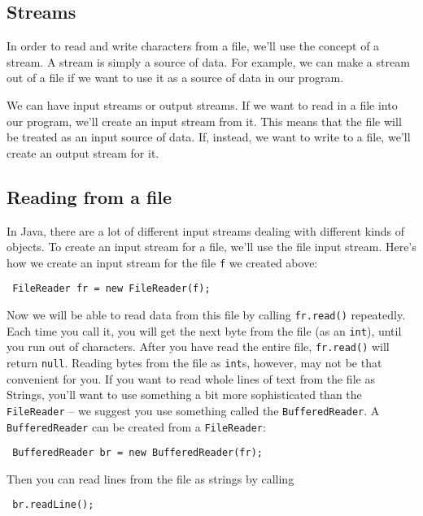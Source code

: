\documentclass[11pt]{article}
\begin{document}
\subsection*{Streams}

In order to read and write characters from a file, we'll use the concept of a stream. A stream is simply a source of data. For example, we can make a stream out of a file if we want to use it as a source of data in our program.

We can have input streams or output streams. If we want to read in a file into our program, we'll create an input stream from it. This means that the file will be treated as an input source of data. If, instead, we want to write to a file, we'll create an output stream for it.

\subsection*{Reading from a file}

In Java, there are a lot of different input streams dealing with different kinds of objects. To create an input stream for a file, we'll use the file input stream. Here's how we create an input stream for the file \texttt{f} we created above:
\begin{center}
\texttt{
    FileReader fr = new FileReader(f);
}
\end{center}

Now we will be able to read data from this file by calling \texttt{fr.read()} repeatedly. Each time you call it, you will get the next byte from the file (as an \texttt{int}), until you run out of characters. After you have read the entire file, \texttt{fr.read()} will return \texttt{null}.
\newpage
Reading bytes from the file as \texttt{int}s, however, may not be that convenient for you. If you want to read whole lines of text from the file as Strings, you'll want to use something a bit more sophisticated than the \texttt{FileReader} -- we suggest you use something called the \texttt{BufferedReader}. A \texttt{BufferedReader} can be created from a \texttt{FileReader}:
\begin{center}
\texttt{
    BufferedReader br = new BufferedReader(fr);
}
\end{center}

Then you can read lines from the file as strings by calling
\begin{center}
\texttt{
    br.readLine();
}
\end{center}
\end{document}
